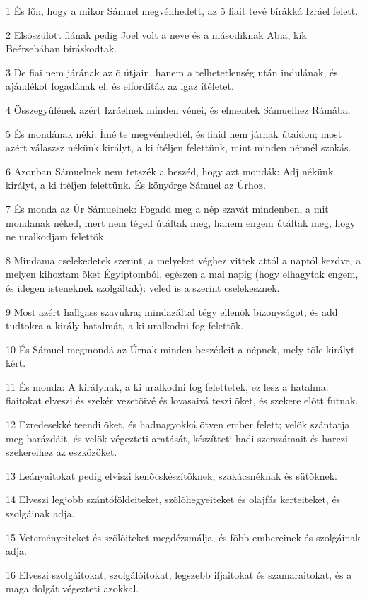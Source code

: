 \par 1 És lõn, hogy a mikor Sámuel megvénhedett, az õ fiait tevé bírákká Izráel felett.
\par 2 Elsõszülött fiának pedig Joel volt a neve és a másodiknak Abia, kik Beérsebában bíráskodtak.
\par 3 De fiai nem járának az õ útjain, hanem a telhetetlenség után indulának, és ajándékot fogadának el, és elfordíták az igaz ítéletet.
\par 4 Összegyûlének azért Izráelnek minden vénei, és elmentek Sámuelhez Rámába.
\par 5 És mondának néki: Ímé te megvénhedtél, és fiaid nem járnak útaidon; most azért válaszsz nékünk királyt, a ki ítéljen felettünk, mint minden népnél szokás.
\par 6 Azonban Sámuelnek nem tetszék a beszéd, hogy azt mondák: Adj nékünk királyt, a ki ítéljen felettünk. És könyörge Sámuel az Úrhoz.
\par 7 És monda az Úr Sámuelnek: Fogadd meg a nép szavát mindenben, a mit mondanak néked, mert nem téged útáltak meg, hanem engem útáltak meg, hogy ne uralkodjam felettök.
\par 8 Mindama cselekedetek szerint, a melyeket véghez vittek attól a naptól kezdve, a melyen kihoztam õket Égyiptomból, egészen a mai napig (hogy elhagytak engem, és idegen isteneknek szolgáltak): veled is a szerint cselekesznek.
\par 9 Most azért hallgass szavukra; mindazáltal tégy ellenök bizonyságot, és add tudtokra a király hatalmát, a ki uralkodni fog felettök.
\par 10 És Sámuel megmondá az Úrnak minden beszédeit a népnek, mely tõle királyt kért.
\par 11 És monda: A királynak, a ki uralkodni fog felettetek, ez lesz a hatalma: fiaitokat elveszi és szekér vezetõivé és lovasaivá teszi õket, és szekere elõtt futnak.
\par 12 Ezredesekké teendi õket, és hadnagyokká ötven ember felett; velök szántatja meg barázdáit, és velök végezteti aratását, készítteti hadi szerszámait és harczi szekereihez az eszközöket.
\par 13 Leányaitokat pedig elviszi kenõcskészítõknek, szakácsnéknak és sütõknek.
\par 14 Elveszi legjobb szántóföldeiteket, szõlõhegyeiteket és olajfás kerteiteket, és szolgáinak adja.
\par 15 Veteményeiteket és szõlõiteket megdézsmálja, és fõbb embereinek és szolgáinak adja.
\par 16 Elveszi szolgáitokat, szolgálóitokat, legszebb ifjaitokat és szamaraitokat, és a maga dolgát végezteti azokkal.
